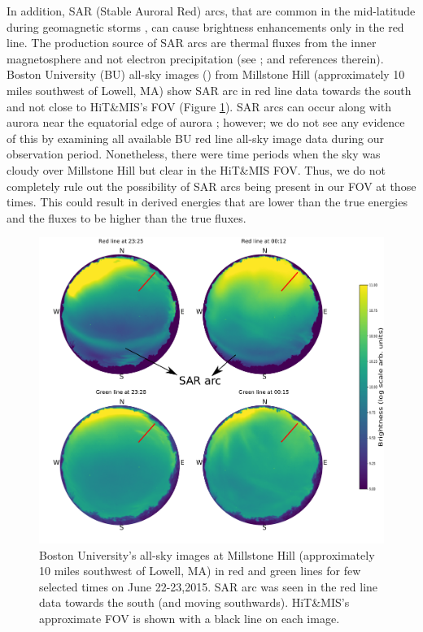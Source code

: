 \documentclass[crop=false,class=mitthesis,oneside,font=12pt]{standalone}
\begin{document}
In addition, SAR (Stable Auroral Red) arcs, that are common in the mid-latitude during geomagnetic storms \citep{mendillo_sar}, can cause brightness enhancements only in the red line. The production source of SAR arcs are thermal fluxes from the inner magnetosphere and not electron precipitation (see \cite{mendillo_sar}; \cite{kozyra_1997,rees_1975} and references therein). Boston University (BU) all-sky images (\cite{asi_1993}) from Millstone Hill (approximately 10 miles southwest of Lowell, MA) show SAR arc in red line data towards the south and not close to HiT\&MIS's FOV (Figure \ref{fig:allsky}). SAR arcs can occur along with aurora near the equatorial edge of aurora \citep{ievenko_2008}; however; we do not see any evidence of this by examining all available BU red line all-sky image data during our observation period. Nonetheless, there were time periods when the sky was cloudy over Millstone Hill but clear in the HiT\&MIS FOV. Thus, we do not completely rule out the possibility of SAR arcs being present in our FOV at those times. This could result in derived energies that are lower than the true energies and the fluxes to be higher than the true fluxes. 
\begin{figure}[H]
	\centering\includegraphics[width=35pc]{allsky.pdf}
	\caption{Boston University's all-sky images at Millstone Hill (approximately 10 miles southwest of Lowell, MA) in red and green lines for few selected times on June 22-23,2015. SAR arc was seen in the red line data towards the south (and moving southwards). HiT\&MIS's approximate FOV is shown with a black line on each image.}
	\label{fig:allsky}
\end{figure}
\end{document}
